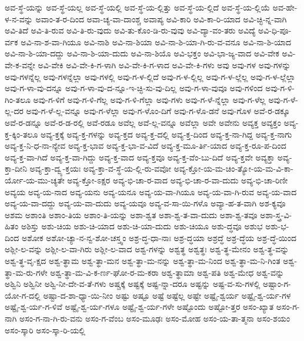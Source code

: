 {ಅವ-ಸ್ಥೆ-ಯನ್ನು
ಅವ-ಸ್ಥೆ-ಯಲ್ಲ
ಅವ-ಸ್ಥೆ-ಯಲ್ಲಿ
ಅವ-ಸ್ಥೆ-ಯ-ಲ್ಲಿತ್ತು
ಅವ-ಸ್ಥೆ-ಯ-ಲ್ಲಿದೆ
ಅವ-ಸ್ಥೆ-ಯ-ಲ್ಲಿಯೆ
ಅವ-ಹೇ-ಳ-ನ-ವನ್ನು
ಅವಾಂ-ತ-ರ-ದಿಂದ
ಅವಾ-ಚ್ಯ-ವಾ-ದಾಂಶ್ಚ
ಅವಾಪ್ಯ
ಅವಿ-ಕಾರಿ
ಅವಿ-ಕಾ-ರಿ-ಯಾದ
ಅವಿ-ಚ್ಛಿ-ನ್ನ-ವಾಗಿ
ಅವಿ-ತಿದೆ
ಅವಿ-ತಿ-ರುವ
ಅವಿ-ತಿ-ರು-ವುದು
ಅವಿ-ತು-ಕೊಂ-ಡಿ-ರು-ವುವು
ಅವಿ-ದ್ಯಾ-ವಂ-ತರು
ಅವಿದ್ಯೆ
ಅವಿ-ಧಿ-ಪೂ-ರ್ವಕ
ಅವಿ-ನಾ-ಶ-ವಾ-ಗಿಯೂ
ಅವಿ-ನಾಶಿ
ಅವಿ-ನಾ-ಶಿಯಾ
ಅವಿ-ನಾ-ಶಿ-ಯಾ-ಗಿ-ರು-ವ-ವನೂ
ಅವಿ-ನಾ-ಶಿ-ಯಾದ
ಅವಿ-ನಾ-ಶಿ-ಯಾ-ದದ್ದು
ಅವಿ-ನಾ-ಶಿ-ಯಾ-ದುದು
ಅವಿ-ನಾ-ಶಿಯೊ
ಅವಿ-ಭಕ್ತಂ
ಅವಿ-ಭಾ-ಜ್ಯ-ವಾದ
ಅವಿ-ವೇಕ
ಅವಿ-ವೇ-ಕ-ವನ್ನೇ
ಅವಿ-ವೇಕಿ
ಅವಿ-ವೇ-ಕಿ-ಗ-ಳಾಗಿ
ಅವಿ-ವೇ-ಕಿ-ಗ-ಳಾದ
ಅವಿ-ವೇ-ಕಿ-ಗಳು
ಅವು
ಅವು-ಗಳ
ಅವು-ಗಳನ್ನು
ಅವು-ಗಳನ್ನೆಲ್ಲ
ಅವು-ಗಳನ್ನೆಲ್ಲಾ
ಅವು-ಗಳಲ್ಲಿ
ಅವು-ಗ-ಳ-ಲ್ಲಿದೆ
ಅವು-ಗ-ಳ-ಲ್ಲಿಲ್ಲ
ಅವು-ಗ-ಳ-ಲ್ಲೆಲ್ಲ
ಅವು-ಗ-ಳ-ಲ್ಲೆಲ್ಲಾ
ಅವು-ಗ-ಳಾ-ವು-ದನ್ನೂ
ಅವು-ಗ-ಳಾ-ವು-ದ-ನ್ನೂ-ಇ-ಚ್ಛಿ-ಸು-ವು-ದಿಲ್ಲ
ಅವು-ಗ-ಳಾ-ವುವೂ
ಅವು-ಗಳಿಂದ
ಅವು-ಗ-ಳಿ-ಗಿಂ-ತಲೂ
ಅವು-ಗ-ಳಿಗೆ
ಅವು-ಗ-ಳಿ-ಗೆಲ್ಲ
ಅವು-ಗ-ಳಿ-ಗೆಲ್ಲಾ
ಅವು-ಗಳು
ಅವು-ಗ-ಳೆ-ನ್ನೆಲ್ಲಾ
ಅವು-ಗ-ಳೆಲ್ಲ
ಅವು-ಗ-ಳೆ-ಲ್ಲ-ದರ
ಅವು-ಗ-ಳೆ-ಲ್ಲ-ವನ್ನೂ
ಅವು-ಗ-ಳೆಲ್ಲಾ
ಅವು-ಗ-ಳೊಂ-ದಿಗೆ
ಅವು-ಗ-ಳೊ-ಡನೆ
ಅವು-ಗೊಳ
ಅವೆ-ರ-ಡಕ್ಕೂ
ಅವೆ-ರ-ಡನ್ನೂ
ಅವೆ-ರ-ಡ-ರಲ್ಲಿ
ಅವೆ-ರಡೂ
ಅವೆಲ್ಲ
ಅವೆ-ಲ್ಲ-ವನ್ನೂ
ಅವೆಲ್ಲಾ
ಅವೇ
ಅವೇನು
ಅವ್ಯಕ್ತ
ಅವ್ಯಕ್ತಂ
ಅವ್ಯ-ಕ್ತ-ಕ್ಕಿಂ-ತಲೂ
ಅವ್ಯ-ಕ್ತಕ್ಕೆ
ಅವ್ಯ-ಕ್ತ-ಗಳನ್ನು
ಅವ್ಯ-ಕ್ತದ
ಅವ್ಯ-ಕ್ತ-ದಲ್ಲಿ
ಅವ್ಯ-ಕ್ತ-ದಿಂದ
ಅವ್ಯ-ಕ್ತ-ನಾ-ಗಿದ್ದ
ಅವ್ಯ-ಕ್ತ-ನಾಗು
ಅವ್ಯ-ಕ್ತ-ನಿ-ಧ-ನಾ-ನ್ಯೇವ
ಅವ್ಯ-ಕ್ತ-ಭಾವ
ಅವ್ಯ-ಕ್ತ-ಭಾ-ವ-ವಿದೆ
ಅವ್ಯ-ಕ್ತ-ಮೂ-ರ್ತಿ-ಯಾದ
ಅವ್ಯ-ಕ್ತ-ರೂ-ಪ-ದಿಂದ
ಅವ್ಯ-ಕ್ತ-ವಾ-ಗಿದೆ
ಅವ್ಯ-ಕ್ತ-ವಾ-ಗಿದ್ದು
ಅವ್ಯ-ಕ್ತ-ವಾದ
ಅವ್ಯ-ಕ್ತವೂ
ಅವ್ಯ-ಕ್ತ-ವೆಂ-ಬು-ದಿದೆ
ಅವ್ಯ-ಕ್ತವೇ
ಅವ್ಯಕ್ತಾ
ಅವ್ಯ-ಕ್ತಾ-ದೀನಿ
ಅವ್ಯ-ಕ್ತಾ-ದ್ವ್ಯ-ಕ್ತಯಃ
ಅವ್ಯ-ಕ್ತಾ-ವ-ಸ್ಥೆ-ಯ-ಲ್ಲಿ-ರು-ವವೋ
ಅವ್ಯ-ಕ್ತೋ-ಯ-ಮ-ಚಿಂ-ತ್ಯೋ-ಯ-ಮ-ವಿ-ಕಾ-ರ್ಯೋ-ಯ-ಮು-ಚ್ಯತೇ
ಅವ್ಯ-ಕ್ತೋ-ಽಕ್ಷರ
ಅವ್ಯ-ಭಿ-ಚಾ-ರ-ವಾದ
ಅವ್ಯ-ಭಿ-ಚಾ-ರ-ವಾ-ದುದು
ಅವ್ಯ-ಭಿ-ಚಾ-ರಿಣೀ
ಅವ್ಯಯ
ಅವ್ಯ-ಯ-ನಾದ
ಅವ್ಯ-ಯನು
ಅವ್ಯ-ಯನೂ
ಅವ್ಯ-ಯ-ವಾ-ಗಿಯೂ
ಅವ್ಯ-ಯ-ವಾ-ಗಿ-ರುವ
ಅವ್ಯ-ಯ-ವಾದ
ಅವ್ಯ-ಯ-ವಾ-ದದ್ದು
ಅವ್ಯ-ಯ-ವಾ-ದುದು
ಅವ್ಯ-ಯವೂ
ಅವ್ಯ-ವ-ಸಾ-ಯಿ-ಗಳೊ
ಅವ್ಯಾ-ಹ-ತ-ವಾಗಿ
ಅಶ-ಕ್ಯವೂ
ಅಶಮ
ಅಶಾಂತಿ
ಅಶಾಂ-ತಿಯ
ಅಶಾಂ-ತಿ-ಯನ್ನು
ಅಶಾ-ಶ್ವತ
ಅಶಾ-ಶ್ವ-ತ-ವಾ-ದುದು
ಅಶಾ-ಶ್ವ-ತವೂ
ಅಶಾ-ಸ್ತ್ರ-ವಿ-ಹಿತಂ
ಅಶಿಸ್ತು
ಅಶು-ಚಿಯ
ಅಶು-ಚಿ-ಯಾದ
ಅಶು-ಚಿ-ಯಾ-ದುದು
ಅಶು-ಚಿಯೂ
ಅಶು-ದ್ಧವೂ
ಅಶುಭ
ಅಶು-ಭ-ದಿಂದ
ಅಶೋಕ
ಅಶೋ-ಚ್ಯಾ-ನ-ನ್ವ-ಶೋ-ಚಸ್ತ್ವಂ
ಅಶ್ರ-ದ್ಧ-ಧಾ-ನಾಃ
ಅಶ್ರ-ದ್ಧಯಾ
ಅಶ್ರದ್ಧೆ
ಅಶ್ರ-ದ್ಧೆಯ
ಅಶ್ರ-ದ್ಧೆ-ಯಿಂದ
ಅಶ್ಲೀ-ಲ-ವನ್ನು
ಅಶ್ಲೀ-ಲ-ವಾ-ಗಿರು
ಅಶ್ಲೀ-ಲ-ವಾದ
ಅಶ್ವ-ಗಳನ್ನು
ಅಶ್ವತ್ಥ
ಅಶ್ವತ್ಥಃ
ಅಶ್ವ-ತ್ಥ-ಮೇನಂ
ಅಶ್ವ-ತ್ಥ-ವನ್ನು
ಅಶ್ವ-ತ್ಥ-ವೃ-ಕ್ಷದ
ಅಶ್ವ-ತ್ಥಾಮ
ಅಶ್ವ-ತ್ಥಾ-ಮನ
ಅಶ್ವ-ತ್ಥಾ-ಮ-ನನ್ನು
ಅಶ್ವ-ತ್ಥಾ-ಮ-ನಿಂದ
ಅಶ್ವ-ತ್ಥಾ-ಮ-ನಿ-ಗಿಂತ
ಅಶ್ವ-ತ್ಥಾ-ಮ-ರು-ಗಳೇ
ಅಶ್ವ-ತ್ಥಾ-ಮ-ವಿ-ಕ-ರ್ಣ-ಘೋ-ರ-ಮ-ಕರಾ
ಅಶ್ವ-ತ್ಥಾಮಾ
ಅಶ್ವ-ಪತಿ
ಅಶ್ವ-ಮೇಧ
ಅಶ್ವ-ವನ್ನು
ಅಶ್ವಿನಿ
ಅಶ್ವಿನೀ
ಅಶ್ವಿ-ನೀ-ದೇ-ವ-ತೆ-ಗಳು
ಅಷ್ಚಕ್ಕೆ
ಅಷ್ಟಕ್ಕೆ
ಅಷ್ಟ-ನ್ನಾ-ದರೂ
ಅಷ್ಟನ್ನು
ಅಷ್ಟ-ವ-ಸು-ಗಳಲ್ಲಿ
ಅಷ್ಟಾಂ-ಗ-ಯೋ-ಗ-ದಲ್ಲಿ
ಅಷ್ಟಾ-ದ-ಶಾ-ಧ್ಯಾ-ಯಿ-ನೀಂ
ಅಷ್ಟು
ಅಷ್ಟೂ
ಅಷ್ಟೆ
ಅಷ್ಟೆಲ್ಲ
ಅಷ್ಟೇ
ಅಷ್ಟೈ-ಶ್ವರ್ಯ
ಅಷ್ಟೈ-ಶ್ವ-ರ್ಯ-ಗಳ
ಅಷ್ಟೈ-ಶ್ವ-ರ್ಯ-ಗ-ಳಿವೆ
ಅಷ್ಟೈ-ಶ್ವ-ರ್ಯ-ಗಳೂ
ಅಷ್ಟೈ-ಶ್ವ-ರ್ಯ-ಗಳೇ
ಅಷ್ಟೊಂದು
ಅಷ್ಟೋ-ತ್ತರ
ಅಸಂ-ಖ್ಯಾತ
ಅಸಂ-ಗ-ನಾಗಿ
ಅಸಂ-ಗ-ನಾ-ಗಿ-ರು-ವನು
ಅಸಂ-ಗ-ವೆಂಬ
ಅಸಂ-ಮೂಢಃ
ಅಸಂ-ಮೋಹ
ಅಸಂ-ಯ-ತಾ-ತ್ಮನಾ
ಅಸಂ-ಶಯಂ
ಅಸಂ-ಸ್ಕಾರಿ
ಅಸಂ-ಸ್ಕಾ-ರಿ-ಯಲ್ಲಿ
}
